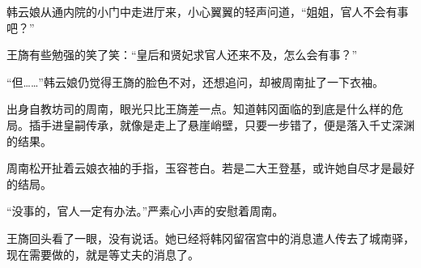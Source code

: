 韩云娘从通内院的小门中走进厅来，小心翼翼的轻声问道，“姐姐，官人不会有事吧？”

王旖有些勉强的笑了笑：“皇后和贤妃求官人还来不及，怎么会有事？”

“但……”韩云娘仍觉得王旖的脸色不对，还想追问，却被周南扯了一下衣袖。

出身自教坊司的周南，眼光只比王旖差一点。知道韩冈面临的到底是什么样的危局。插手进皇嗣传承，就像是走上了悬崖峭壁，只要一步错了，便是落入千丈深渊的结果。

周南松开扯着云娘衣袖的手指，玉容苍白。若是二大王登基，或许她自尽才是最好的结局。

“没事的，官人一定有办法。”严素心小声的安慰着周南。

王旖回头看了一眼，没有说话。她已经将韩冈留宿宫中的消息遣人传去了城南驿，现在需要做的，就是等丈夫的消息了。

